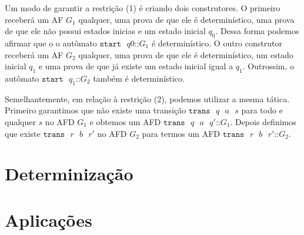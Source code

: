 Um modo de garantir a restrição (1) é criando dois construtores. O primeiro receberá um AF $G_1$ qualquer, uma prova de que ele é determinístico, uma prova de que ele não possui estados inicias e um estado inicial $q_0$. Dessa forma podemos afirmar que o o autômato $\texttt{start}\text{ }q0\texttt{::}G_1$ é determinístico. O outro construtor receberá um AF $G_2$ qualquer, uma prova de que ele é determinístico, um estado inicial $q_1$ e uma prova de que já existe um estado inicial igual a $q_1$. Outrossim, o autômato $\texttt{start}\text{ }q_1\texttt{::}G_2$ também é determinístico.

Semelhantemente, em relação à restrição (2), podemos utilizar a mesma tática. Primeiro garantimos que não existe uma transição $\texttt{trans}\text{ }q\text{ }a\text{ }s$ para todo e qualquer $s$ no AFD $G_1$ e obtemos um AFD $\texttt{trans}\text{ }q\text{ }a\text{ }q'\texttt{::}G_1$. Depois definimos que existe $\texttt{trans}\text{ }r\text{ }b\text{ }r'$ no AFD $G_2$ para termos um AFD $\texttt{trans}\text{ }r\text{ }b\text{ }r'\texttt{::}G_2$.

\section{Determinização}

\section{Aplicações}